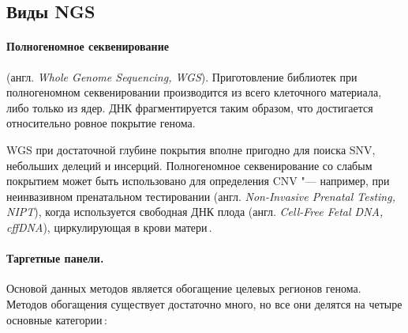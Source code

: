 \documentclass[a4paper,14pt]{extarticle}
\newcommand{\ecitep}[1]{\textenglish{\citep{#1}}}
\newcommand{\engterm}[1]{англ. \textenglish{\textit{#1}}}
\begin{document}
\subsection{Виды NGS}

\paragraph{Полногеномное секвенирование} (\engterm{Whole Genome Sequencing, WGS}).
Приготовление библиотек при полногеномном секвенировании производится из всего клеточного материала, либо только из ядер.
ДНК фрагментируется таким образом, что достигается относительно ровное покрытие генома.

WGS при достаточной глубине покрытия вполне пригодно для поиска SNV, небольших делеций и инсерций.
Полногеномное секвенирование со слабым покрытием может быть использовано для определения CNV "--- например, при неинвазивном пренатальном тестировании (\engterm{Non-Invasive Prenatal Testing, NIPT}), когда используется свободная ДНК плода (\engterm{Cell-Free Fetal DNA, cffDNA}), циркулирующая в крови матери\,\ecitep{Yu_2019}.

\paragraph{Таргетные панели.}
Основой данных методов является обогащение целевых регионов генома.
Методов обогащения существует достаточно много, но все они делятся на четыре основные категории\,\ecitep{Teer_2010}:
\end{document}
